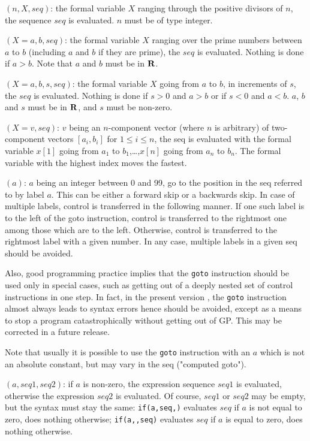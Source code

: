 $(n,X,seq)$: the formal variable $X$ ranging through the
positive divisors of $n$, the sequence $seq$ is evaluated. $n$ must be of type integer.

$(X=a,b,seq)$: the formal variable $X$ ranging over the prime
numbers between $a$ to $b$ (including $a$ and $b$ if they are prime),
the $seq$ is evaluated. Nothing is done if $a>b$. Note that $a$ and $b$
must be in $\Bbb R$.

$(X=a,b,s,seq)$: the formal variable $X$ going from $a$ to
$b$, in increments of $s$, the $seq$ is evaluated. Nothing is done if $s>0$ and 
$a>b$ or if $s<0$ and $a<b$. $a$, $b$ and $s$ must be in $\Bbb R$, and $s$ must
be non-zero.

$(X=v,seq)$: $v$ being an $n$-component vector (where
$n$ is arbitrary) of two-component vectors $[a_i,b_i]$ for $1\le i\le n$,
the seq is evaluated with the formal variable $x[1]$ going from $a_1$
to $b_1$,\dots,$x[n]$ going from $a_n$ to $b_n$. The formal variable
with the highest index moves the fastest. 

$(a)$: $a$ being an integer between 0 and 99, go to the
position in the seq referred to by label $a$. This can be either a forward skip
or a backwards skip. In case of multiple labels, control is transferred in the
following manner. If one such label is to the left of the goto instruction, 
control is transferred to the rightmost one among those which are to the left.
Otherwise, control is transferred to the rightmost label with a given number.
In any case, multiple labels in a given seq should be avoided. 

Also, good programming practice implies that the 
{\tt goto} instruction should be used only in special cases, such as getting
out of a deeply nested set of control instructions in one step.
In fact, in the present version \vers, the {\tt goto} instruction almost always
leads to syntax errors hence should be avoided, except as a means to stop a
program catastrophically without getting out of GP. This may be corrected in a
future release.

Note that usually it is possible to use the {\tt goto} instruction
with an $a$ which is not an absolute constant, but may vary in the seq
("computed goto").

$(a,seq1,seq2)$: if $a$ is non-zero, the expression sequence $seq1$
is evaluated, otherwise the expression $seq2$ is evaluated. Of course, $seq1$ or $seq2$
may be empty, but the syntax must stay the same: {\tt if(a,seq,)} evaluates $seq$ if
$a$ is not equal to zero, does nothing otherwise; {\tt if(a,,seq)} evaluates $seq$ if $a$
is equal to zero, does nothing otherwise.

